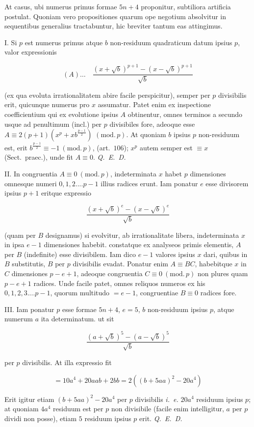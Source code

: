 At casus, ubi numerus primus formae $5n+4$ proponitur, subtiliora artificia postulat. Quoniam vero propositiones quarum ope negotium absolvitur in sequentibus generalius tractabuntur, hic breviter tantum eas attingimus.

I. Si $p$ est numerus primus atque $b$ non-residuum quadraticum datum ipsius $p$, valor expressionis

\[
(A)\ldots\quad\frac{(x+\surd b)^{p+1}-(x-\surd b)^{p+1}}{\surd b}
\]

(ex qua evoluta irrationalitatem abire facile perspicitur), semper per $p$ divisibilis erit, quicunque numerus pro $x$ assumatur. Patet enim ex inspectione coefficientium qui ex evolutione ipsius $A$ obtinentur, omnes terminos a secundo usque ad penultimum (incl.) per $p$ divisibiles fore, adeoque esse $A\equiv2(p+1)(x^p+xb^{\frac{p-1}{2}})$ $(\mathrm{mod.}\,p)$. At quoniam $b$ ipsius $p$ non-residuum est, erit $b^{\frac{p-1}{2}}\equiv-1\ (\mathrm{mod.}\,p)$, (art.\ $106$); $x^p$ autem semper est $\equiv x$ (Sect.\ praec.), unde fit $A\equiv0$. \textit{Q.\ E.\ D.}

II. In congruentia $A\equiv0\ (\mathrm{mod.}\,p)$, indeterminata $x$ habet $p$ dimensiones omnesque numeri $0,1,2....p-1$ illius radices erunt. Iam ponatur $e$ esse divisorem ipsius $p+1$ eritque expressio

\[
\frac{(x+\surd b)^e-(x-\surd b)^e}{\surd b}
\]

(quam per $B$ designamus) si evolvitur, ab irrationalitate libera, indeterminata $x$ in ipsa $e-1$ dimensiones habebit. constatque ex analyseos primis elementis, $A$ per $B$ (indefinite) esse divisibilem. Iam dico $e-1$ valores ipsius $x$ dari, quibus in $B$ substitutis, $B$ per $p$ divisibilis evadat. Ponatur enim $A\equiv BC$, habebitque $x$ in $C$ dimensiones $p-e+1$, adeoque congruentia $C\equiv0\ (\mathrm{mod.}\,p)$ non plures quam $p-e+1$ radices. Unde facile patet, omnes reliquos numeros ex his $0,1,2,3....p-1$, quorum multitudo $=e-1$, congruentiae $B\equiv0$ radices fore.

III. Iam ponatur $p$ esse formae $5n+4$, $e=5$, $b$ non-residuum ipsius $p$, atque numerum $a$ ita determinatum. ut sit

\[
\frac{(a+\surd b)^5-(a-\surd b)^5}{\surd b}
\]

per $p$ divisibilis. At illa expressio fit

\[
=10a^4+20aab+2bb=2((b+5aa)^2-20a^4)
\]

Erit igitur etiam $(b+5aa)^2-20a^4$ per $p$ divisibilis \textit{i.\ e.} $20a^4$ residuum ipsius $p$; at quoniam $4a^4$ residuum est per $p$ non divisibile (facile enim intelligitur, $a$ per $p$ dividi non posse), etiam $5$ residuum ipsius $p$ erit. \textit{Q.\ E.\ D.}

